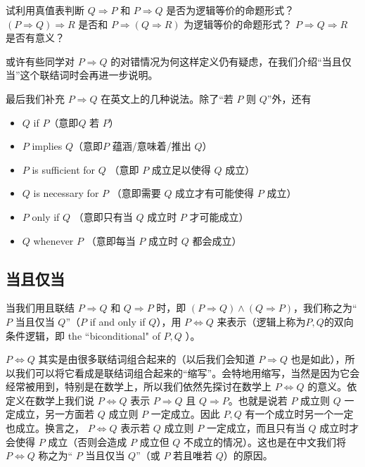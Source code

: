\begin{question}
试利用真值表判断 \(Q\Rightarrow P\) 和 \(P\Rightarrow Q\) 是否为逻辑等价的命题形式？ \((P\Rightarrow Q)\Rightarrow R\) 是否和 \(P\Rightarrow (Q\Rightarrow R)\) 为逻辑等价的命题形式？ \(P\Rightarrow Q\Rightarrow R\) 是否有意义？
\end{question}

或许有些同学对 \(P\Rightarrow Q\) 的对错情况为何这样定义仍有疑虑，在我们介绍“当且仅当”这个联结词时会再进一步说明。

最后我们补充 \(P \Rightarrow Q\) 在英文上的几种说法。除了“若 \(P\) 则 \(Q\)”外，还有
\begin{itemize}
\item \(Q\) if \(P\)（意即\(Q\) 若 \(P\)）
\item \(P\) implies \(Q\)（意即\(P\) 蕴涵/意味着/推出 \(Q\)）
\item \(P\) is sufficient for \(Q\) （意即 \(P\) 成立足以使得 \(Q\) 成立）
\item \(Q\) is necessary for \(P\) （意即需要 \(Q\) 成立才有可能使得 \(P\) 成立）
\item \(P\) only if \(Q\) （意即只有当 \(Q\) 成立时 \(P\) 才可能成立）
\item \(Q\) whenever \(P\) （意即每当 \(P\) 成立时 \(Q\) 都会成立）
\end{itemize}

\subsection{当且仅当}
当我们用且联结 \(P \Rightarrow Q\) 和 \(Q \Rightarrow P\) 时，即 \((P \Rightarrow Q) \land (Q \Rightarrow P)\)，我们称之为“\(P\) 当且仅当 \(Q\)”（\(P\) if and only if \(Q\)），用 \(P \Leftrightarrow Q\) 来表示（逻辑上称为\(P,Q\)的双向条件逻辑，即 the ``biconditional" of \(P , Q\) ）。

\(P \Leftrightarrow Q\) 其实是由很多联结词组合起来的（以后我们会知道 \(P \Rightarrow Q\) 也是如此），所以我们可以将它看成是联结词组合起来的“缩写”。会特地用缩写，当然是因为它会经常被用到，特别是在数学上，所以我们依然先探讨在数学上 \(P \Leftrightarrow Q\) 的意义。依定义在数学上我们说 \(P \Leftrightarrow Q\) 表示 \(P \Rightarrow Q\) 且 \(Q \Rightarrow P\)。也就是说若 \(P\) 成立则 \(Q\) 一定成立，另一方面若 \(Q\) 成立则 \(P\) 一定成立。因此 \(P, Q\) 有一个成立时另一个一定也成立。换言之， \(P \Leftrightarrow Q\) 表示若 \(Q\) 成立则 \(P\) 一定成立，而且只有当 \(Q\) 成立时才会使得 \(P\) 成立（否则会造成 \(P\) 成立但 \(Q\) 不成立的情况）。这也是在中文我们将 \(P \Leftrightarrow Q\) 称之为“ \(P\) 当且仅当 \(Q\)”（或 \(P\) 若且唯若 \(Q\)）的原因。


